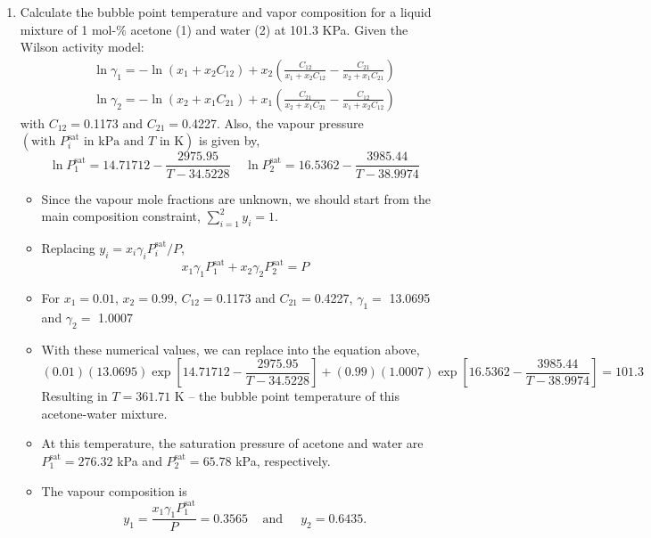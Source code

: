 \documentclass[12pts,a4paper,amsmath,amssymb,floatfix]{article}%
\newcommand{\frc}{\displaystyle\frac}
\begin{document}
\begin{enumerate}[1)]
\clearpage
            
   \item\label{Mod05Ex04} Calculate the bubble point temperature and vapor composition for a liquid mixture of 1 mol-$\%$ acetone (1) and water (2) at 101.3 KPa. Given the Wilson activity model:
   \begin{eqnarray}
       &&\ln\gamma_{1} = -\ln\left(x_{1}+x_{2}C_{12}\right) + x_{2}\left(\frc{C_{12}}{x_{1}+x_{2}C_{12}}-\frc{C_{21}}{x_{2}+x_{1}C_{21}}\right) \nonumber \\
       &&\ln\gamma_{2} = -\ln\left(x_{2}+x_{1}C_{21}\right) + x_{1}\left(\frc{C_{21}}{x_{2}+x_{1}C_{21}}-\frc{C_{12}}{x_{1}+x_{2}C_{12}}\right) \nonumber
   \end{eqnarray}
   with $C_{12}=$0.1173 and $C_{21}=$0.4227. Also, the vapour pressure $\left(\text{with } P_{i}^{\text{sat}}\text{ in kPa and } T\text{ in K}\right)$ is given by,
\begin{displaymath}
   \ln P_{1}^{\text{sat}} = 14.71712 - \frc{2975.95}{T-34.5228} \;\;\;\; \ln P_{2}^{\text{sat}} = 16.5362 - \frc{3985.44}{T-38.9974}
\end{displaymath}


   \begin{itemize}
      \item Since the vapour mole fractions are unknown, we should start from the main composition constraint, $\sum\limits_{i=1}^{2}y_{i} = 1$.  
      \item Replacing $y_{i}=x_{i}\gamma_{i}P_{i}^{\text{sat}}/P$,
         \begin{displaymath}
            x_{1}\gamma_{1}P_{1}^{\text{sat}} + x_{2}\gamma_{2}P_{2}^{\text{sat}} = P
         \end{displaymath}
      \item For $x_{1} = 0.01$, $x_{2}=0.99$, $C_{12}=$0.1173 and $C_{21}=$0.4227, $\gamma_{1}=$ 13.0695 and $\gamma_{2}=$ 1.0007
      \item With these numerical values, we can replace into the equation above,
         \begin{displaymath}
            (0.01)(13.0695)\exp\left[14.71712 - \frc{2975.95}{T-34.5228}\right] + (0.99)(1.0007)\exp\left[16.5362 - \frc{3985.44}{T-38.9974}\right] =  101.3
         \end{displaymath}
         Resulting in  $T= 361.71$ K -- the bubble point temperature of this acetone-water mixture.
      \item At this temperature, the saturation pressure of acetone and water are $P_{1}^{\text{sat}}= 276.32$ kPa and $P_{2}^{\text{sat}} = 65.78$ kPa, respectively.
      \item The vapour composition is
         \begin{displaymath}
             y_{1} =\frc{x_{1}\gamma_{1}P_{1}^{\text{sat}}}{P} = 0.3565\;\;\;\text{ and }\;\;\;\; y_{2} = 0.6435.
         \end{displaymath} 
   \end{itemize}
\clearpage
            

\end{enumerate}
\end{document}
